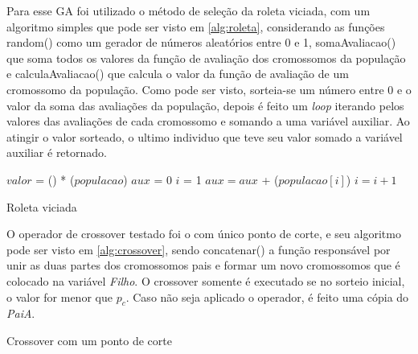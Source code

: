 Para esse GA foi utilizado o método de seleção da roleta viciada, com um algoritmo simples que pode ser visto em \autoref{alg:roleta}, considerando as funções \textsf{random()} como um gerador de números aleatórios entre 0 e 1, \textsf{somaAvaliacao()} que soma todos os valores da função de avaliação dos cromossomos da população e \textsf{calculaAvaliacao()} que calcula o valor da função de avaliação de um cromossomo da população. Como pode ser visto, sorteia-se um número entre 0 e o valor da soma das avaliações da população, depois é feito um \textit{loop} iterando pelos valores das avaliações de cada cromossomo e somando a uma variável auxiliar. Ao atingir o valor sorteado, o ultimo individuo que teve seu valor somado a variável auxiliar é retornado.

\begin{algorithm}[h!]
	\LinesNumbered
	$valor$ = \random() * \somaAvaliacao($populacao$)\;
	$aux$ = 0\;
	$i$ = 1\;
	 {
			$aux = aux$ + \calculaAvaliacao($populacao[i]$) \;
			$i = i + 1$ \;
	}
	\caption{Roleta viciada}
	\label{alg:roleta}
\end{algorithm}

O operador de crossover testado foi o com único ponto de corte, e seu algoritmo pode ser visto em \autoref{alg:crossover}, sendo \textsf{concatenar()} a função responsável por unir as duas partes dos cromossomos pais e formar um novo cromossomos que é colocado na variável \textit{Filho}. O crossover somente é executado se no sorteio inicial, o valor for menor que \(p_c\). Caso não seja aplicado o operador, é feito uma cópia do \textit{PaiA}.

\begin{algorithm}[h!]
	\LinesNumbered
	 
	\caption{Crossover com um ponto de corte}
	\label{alg:crossover}
\end{algorithm}

